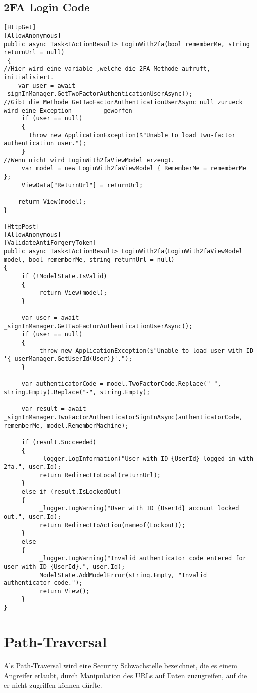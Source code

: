 \subsection{2FA Login Code}
\label{sec:2FALogin}
\begin{lstlisting}[caption={Login}]
[HttpGet]
[AllowAnonymous]
public async Task<IActionResult> LoginWith2fa(bool rememberMe, string returnUrl = null)
 {
//Hier wird eine variable ,welche die 2FA Methode aufruft, initialisiert.
    var user = await _signInManager.GetTwoFactorAuthenticationUserAsync();
//Gibt die Methode GetTwoFactorAuthenticationUserAsync null zurueck wird eine Exception 	    geworfen
     if (user == null)
     {
       throw new ApplicationException($"Unable to load two-factor authentication user.");
     }
//Wenn nicht wird LoginWith2faViewModel erzeugt.
     var model = new LoginWith2faViewModel { RememberMe = rememberMe };
     ViewData["ReturnUrl"] = returnUrl;

    return View(model);
}

[HttpPost]
[AllowAnonymous]
[ValidateAntiForgeryToken]
public async Task<IActionResult> LoginWith2fa(LoginWith2faViewModel model, bool rememberMe, string returnUrl = null)
{
     if (!ModelState.IsValid)
     {
          return View(model);
     }

     var user = await _signInManager.GetTwoFactorAuthenticationUserAsync();
     if (user == null)
     {
          throw new ApplicationException($"Unable to load user with ID '{_userManager.GetUserId(User)}'.");
     }

     var authenticatorCode = model.TwoFactorCode.Replace(" ", string.Empty).Replace("-", string.Empty);

     var result = await _signInManager.TwoFactorAuthenticatorSignInAsync(authenticatorCode, rememberMe, model.RememberMachine);

     if (result.Succeeded)
     {
          _logger.LogInformation("User with ID {UserId} logged in with 2fa.", user.Id);
          return RedirectToLocal(returnUrl);
     }
     else if (result.IsLockedOut)
     {
          _logger.LogWarning("User with ID {UserId} account locked out.", user.Id);
          return RedirectToAction(nameof(Lockout));
     }
     else
     {
          _logger.LogWarning("Invalid authenticator code entered for user with ID {UserId}.", user.Id);
          ModelState.AddModelError(string.Empty, "Invalid authenticator code.");
          return View();
     }
}
\end{lstlisting}
\section{Path-Traversal}
\label{sec:Path-Traversal}
Als Path-Traversal wird eine Security Schwachstelle bezeichnet, die es einem Angreifer erlaubt, durch Manipulation des URLs auf Daten zuzugreifen, auf die er nicht zugriffen können dürfte. 
